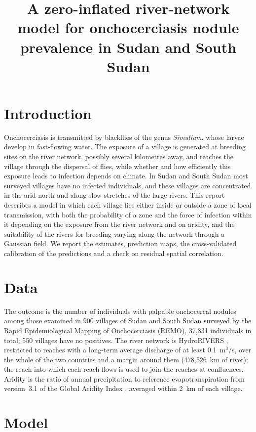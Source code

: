 \documentclass[11pt,a4paper]{article}
\title{A zero-inflated river-network model for onchocerciasis nodule prevalence in Sudan and South Sudan}
\author{}
\date{}
\begin{document}
\maketitle

\section{Introduction}

Onchocerciasis is transmitted by blackflies of the genus \textit{Simulium}, whose larvae develop in fast-flowing water. The exposure of a village is generated at breeding sites on the river network, possibly several kilometres away, and reaches the village through the dispersal of flies, while whether and how efficiently this exposure leads to infection depends on climate. In Sudan and South Sudan most surveyed villages have no infected individuals, and these villages are concentrated in the arid north and along slow stretches of the large rivers. This report describes a model in which each village lies either inside or outside a zone of local transmission, with both the probability of a zone and the force of infection within it depending on the exposure from the river network and on aridity, and the suitability of the rivers for breeding varying along the network through a Gaussian field. We report the estimates, prediction maps, the cross-validated calibration of the predictions and a check on residual spatial correlation.

\section{Data}

The outcome is the number of individuals with palpable onchocercal nodules among those examined in 900 villages of Sudan and South Sudan surveyed by the Rapid Epidemiological Mapping of Onchocerciasis (REMO), 37{,}831 individuals in total; 550 villages have no positives. The river network is HydroRIVERS \citep{lehner2013}, restricted to reaches with a long-term average discharge of at least 0.1~m$^3$/s, over the whole of the two countries and a margin around them (478{,}526~km of river); the reach into which each reach flows is used to join the reaches at confluences. Aridity is the ratio of annual precipitation to reference evapotranspiration from version~3.1 of the Global Aridity Index \citep{zomer2022}, averaged within 2~km of each village.

\section{Model}
\end{document}
